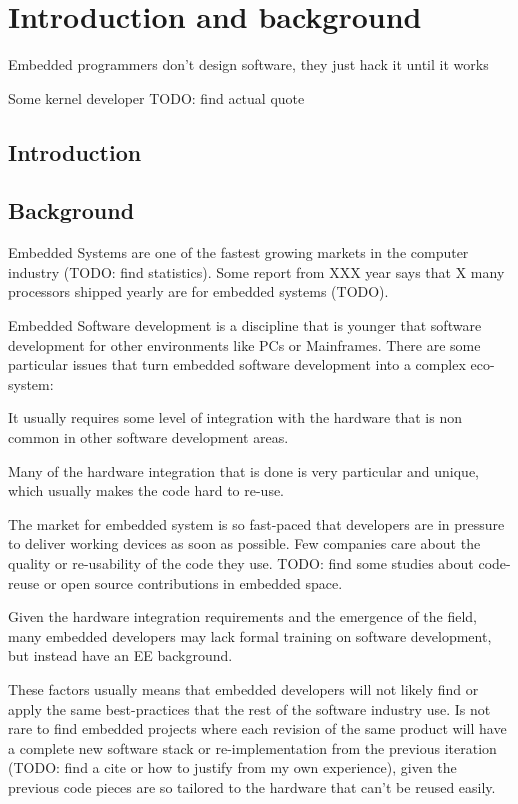 \chapter{Introduction and background}
\epigraph{Embedded programmers don't design software, they just hack it until it works}{Some kernel developer TODO: find actual quote}

\section{Introduction}


\section{Background}
Embedded Systems are one of the fastest growing markets in the computer industry (TODO: find statistics). Some report from XXX year says that X many processors shipped yearly are for embedded systems (TODO).

Embedded Software development is a discipline that is younger that software development for other environments like \acp{PC} or Mainframes. There are some particular issues that turn embedded software development into a complex eco-system:
\begin{itemize*}
\item It usually requires some level of integration with the hardware that is non common in other software development areas.
\item Many of the hardware integration that is done is very particular and unique, which usually makes the code hard to re-use.
\item The market for embedded system is so fast-paced that developers are in pressure to deliver working devices as soon as possible. Few companies care about the quality or re-usability of the code they use. TODO: find some studies about code-reuse or open source contributions in embedded space.
\item Given the hardware integration requirements and the emergence of the field, many embedded developers may lack formal training on software development, but instead have an \ac{EE} background.
\end{itemize*}

These factors usually means that embedded developers will not likely find or apply the same best-practices that the rest of the software industry use. Is not rare to find embedded projects where each revision of the same product will have a complete new software stack or re-implementation from the previous iteration (TODO: find a cite or how to justify from my own experience), given the previous code pieces are so tailored to the hardware that can't be reused easily.

